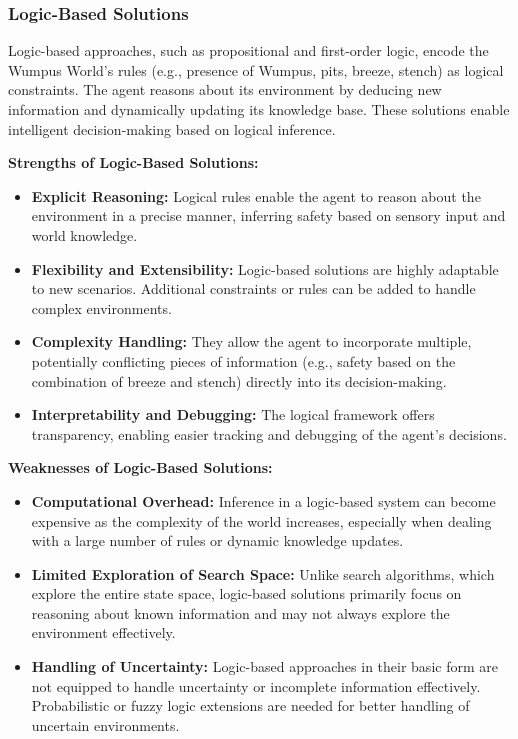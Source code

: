 \documentclass[12pt]{article}
\begin{document}
\subsubsection{Logic-Based Solutions}
Logic-based approaches, such as propositional and first-order logic, encode the Wumpus World’s rules (e.g., presence of Wumpus, pits, breeze, stench) as logical constraints. The agent reasons about its environment by deducing new information and dynamically updating its knowledge base. These solutions enable intelligent decision-making based on logical inference.

\textbf{Strengths of Logic-Based Solutions:}
\begin{itemize}
    \item \textbf{Explicit Reasoning:} Logical rules enable the agent to reason about the environment in a precise manner, inferring safety based on sensory input and world knowledge.
    \item \textbf{Flexibility and Extensibility:} Logic-based solutions are highly adaptable to new scenarios. Additional constraints or rules can be added to handle complex environments.
    \item \textbf{Complexity Handling:} They allow the agent to incorporate multiple, potentially conflicting pieces of information (e.g., safety based on the combination of breeze and stench) directly into its decision-making.
    \item \textbf{Interpretability and Debugging:} The logical framework offers transparency, enabling easier tracking and debugging of the agent’s decisions.
\end{itemize}

\textbf{Weaknesses of Logic-Based Solutions:}
\begin{itemize}
    \item \textbf{Computational Overhead:} Inference in a logic-based system can become expensive as the complexity of the world increases, especially when dealing with a large number of rules or dynamic knowledge updates.
    \item \textbf{Limited Exploration of Search Space:} Unlike search algorithms, which explore the entire state space, logic-based solutions primarily focus on reasoning about known information and may not always explore the environment effectively.
    \item \textbf{Handling of Uncertainty:} Logic-based approaches in their basic form are not equipped to handle uncertainty or incomplete information effectively. Probabilistic or fuzzy logic extensions are needed for better handling of uncertain environments.
\end{itemize}
\end{document}
